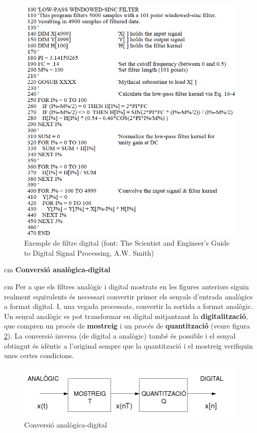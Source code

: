 \documentclass{article}
\begin{document}
\begin{figure}[htbp]
\centering
\includegraphics[width=12cm]{filtredigital.png} 
\caption{Exemple de filtre digital (font: The Scientist and Engineer's Guide to Digital Signal Processing, A.W. Smith)}
\label{filtreDigital}
\end{figure}

 cm
\noindent
\textbf{Conversi\'o anal\`ogica-digital}

 cm
\noindent
Per a que els filtres analògic i digital mostrats en les figures anteriors siguin realment equivalents
és necessari convertir primer els senyals d'entrada analògics a format digital. I, una vegada processats,
convertir la sortida a format analògic.
Un senyal anal\`ogic es pot transformar en digital mitjantzant la
\textbf{digitalitzaci\'o}, que compren un proc\'es de \textbf{mostreig}
i un proc\'es de \textbf{quantitzaci\'o} (veure figura \ref{conversioAD}). 
La conversi\'o inversa (de
digital a anal\`ogic) tamb\'e \'es possible i el senyal obtingut \'es
id\`entic a l'original sempre que la quantitzaci\'o i el mostreig 
verifiquin unes certes condicions.

\begin{figure}[htbp]
\centering
\includegraphics[width=14cm]{conversioAD.png} 
\caption{Conversi\'o anal\`ogica-digital}
\label{conversioAD}
\end{figure}
\end{document}
